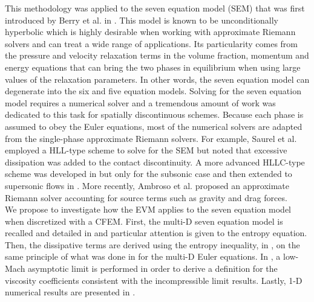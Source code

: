 This methodology was applied to the seven equation model (SEM) that was first introduced by Berry et al. in \cite{SEM}. This model is known to be unconditionally hyperbolic which is highly desirable when working with approximate Riemann solvers and can treat a wide range of applications. Its particularity comes from the pressure and velocity relaxation terms in the volume fraction, momentum and energy equations that can bring the two phases in equilibrium when using large values of the relaxation parameters. In other words, the seven equation model can degenerate into the six and five equation models. Solving for the seven equation model requires a numerical solver and a tremendous amount of work was dedicated to this task for spatially discontinuous schemes. Because each phase is assumed to obey the Euler equations, most of the numerical solvers are adapted from the single-phase approximate Riemann solvers. For example, Saurel et al. \cite{Saurel_2001a, Saurel_2001b} employed a HLL-type scheme to solve for the SEM but noted that excessive dissipation was added to the contact discontinuity. A more advanced HLLC-type scheme was developed in \cite{Li_2004} but only for the subsonic case and then extended to supersonic flows in \cite{Zein_2010}. More recently, Ambroso et al. \cite{Ambroso_2012} proposed an approximate Riemann solver accounting for source terms such as gravity and drag forces.\\

We propose to investigate how the EVM applies to the seven equation model when discretized with a CFEM. First, the multi-D seven equation model is recalled and detailed in  and particular attention is given to the entropy equation. Then, the dissipative terms are derived using the entropy inequality, in , on the same principle of what was done in  for the multi-D Euler equations. In , a low-Mach asymptotic limit is performed in order to derive a definition for the viscosity coefficients consistent with the incompressible limit results. Lastly, 1-D numerical results are presented in .

